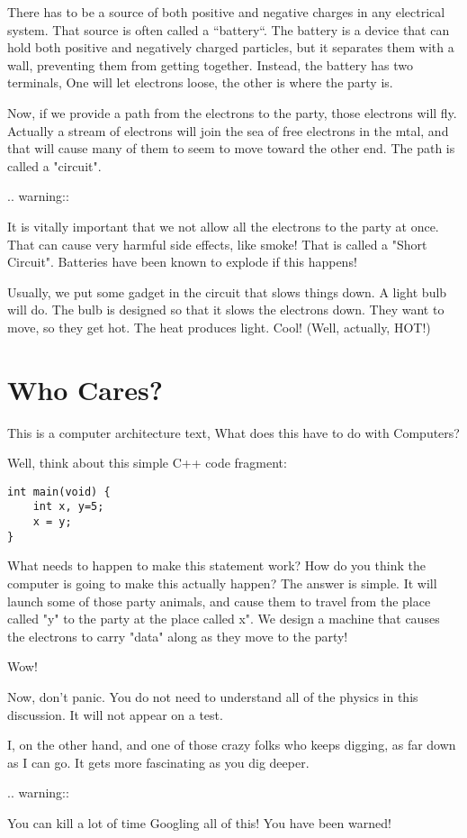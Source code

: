 There has to be a source of both positive and negative charges in any
electrical system. That source is often called a ``battery``. The battery is a
device that can hold both positive and negatively charged particles, but it
separates them with a wall, preventing them from getting together. Instead, the
battery has two terminals, One will let electrons loose, the other is where the
party is.

Now, if we provide a path from the electrons to the party, those electrons will
fly. Actually a stream of electrons will join the sea of free electrons in the
mtal, and that will cause many of them to seem to move toward the other end.
The path is called a "circuit".

..  warning::

    It is vitally important that we not allow all the electrons to the party at
    once. That can cause very harmful side effects, like smoke! That is called
    a "Short Circuit". Batteries have been known to explode if this happens!

    Usually, we put some gadget in the circuit that slows things down. A light
    bulb will do. The bulb is designed so that it slows the electrons down.
    They want to move, so they get hot. The heat produces light. Cool! (Well,
    actually, HOT!)


\section{Who Cares?}

This is a computer architecture text, What does this have to do with
Computers?

Well, think about this simple C++ code fragment:

\begin{verbatim}
int main(void) {
    int x, y=5;
    x = y;
}
\end{verbatim}

What needs to happen to make this statement work? How do you think the
computer is going to make this actually happen? The answer is simple. It will
launch some of those party animals, and cause them to travel from the place
called "y" to the party at the place called x". We design a machine that
causes the electrons to carry "data" along as they move to the party!

Wow!

Now, don't panic. You do not need to understand all of the physics in this
discussion. It will not appear on a test. 

I, on the other hand, and one of those crazy folks who keeps digging, as far
down as I can go. It gets more fascinating as you dig deeper. 

..  warning::

    You can kill a lot of time Googling all of this! You have been warned!













